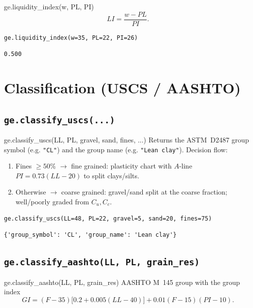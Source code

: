 \documentclass[11pt,a4paper,openany]{book}
\begin{document}
\begin{funcbox}{ge.liquidity\_index(w, PL, PI)}
\[
LI = \frac{w - PL}{PI}.
\]
\end{funcbox}

\begin{lstlisting}
ge.liquidity_index(w=35, PL=22, PI=26)
\end{lstlisting}
\begin{lstlisting}[style=output]
0.500
\end{lstlisting}

\section{Classification (USCS / AASHTO)}

\subsection{\texttt{ge.classify\_uscs(...)}}

\begin{funcbox}{ge.classify\_uscs(LL, PL, gravel, sand, fines, ...)}
Returns the ASTM~D2487 group symbol (e.g. \texttt{"CL"}) and the
group name (e.g. \texttt{"Lean clay"}). Decision flow:
\begin{enumerate}\setlength\itemsep{2pt}
\item Fines $\geq 50\%$ $\to$ fine grained: plasticity chart with
      $A$-line $PI = 0.73(LL - 20)$ to split clays/silts.
\item Otherwise $\to$ coarse grained: gravel/sand split at the
      coarse fraction; well/poorly graded from $C_u, C_c$.
\end{enumerate}
\end{funcbox}

\begin{lstlisting}
ge.classify_uscs(LL=48, PL=22, gravel=5, sand=20, fines=75)
\end{lstlisting}
\begin{lstlisting}[style=output]
{'group_symbol': 'CL', 'group_name': 'Lean clay'}
\end{lstlisting}

\subsection{\texttt{ge.classify\_aashto(LL, PL, grain\_res)}}

\begin{funcbox}{ge.classify\_aashto(LL, PL, grain\_res)}
AASHTO M~145 group with the group index
\[
GI = (F - 35)\bigl[0.2 + 0.005(LL - 40)\bigr] + 0.01(F - 15)(PI - 10).
\]
\end{funcbox}
\end{document}
